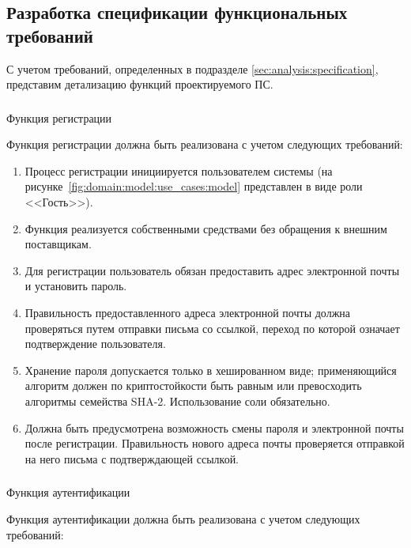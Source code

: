 \subsection{Разработка спецификации функциональных требований}
\label{sec:domain:specification}

С учетом требований, определенных в подразделе \ref{sec:analysis:specification}, представим детализацию функций проектируемого ПС.

\subsubsection{} Функция регистрации
\label{sec:domain:specification:signup}

Функция регистрации должна быть реализована с учетом следующих требований:

\begin{enumerate}
	\item Процесс регистрации инициируется пользователем системы (на рисунке~\ref{fig:domain:model:use_cases:model} представлен в виде роли <<Гость>>).
	\item Функция реализуется собственными средствами без обращения к вне\-ш\-ним поставщикам.
	\item Для регистрации пользователь обязан предоставить адрес электронной почты и установить пароль.
	\item Правильность предоставленного адреса электронной почты должна проверяться путем отправки письма со ссылкой, переход по которой означает подтверждение пользователя.
	\item Хранение пароля допускается только в хешированном виде; применяющийся алгоритм должен по криптостойкости быть равным или превосходить алгоритмы семейства SHA-2. Использование соли обязательно.
	\item Должна быть предусмотрена возможность смены пароля и электронной почты после регистрации. Правильность нового адреса почты проверяется отправкой на него письма с подтверждающей ссылкой.
\end{enumerate}

\subsubsection{} Функция аутентификации
\label{sec:domain:specification:authentication}

Функция аутентификации должна быть реализована с учетом следующих требований:

